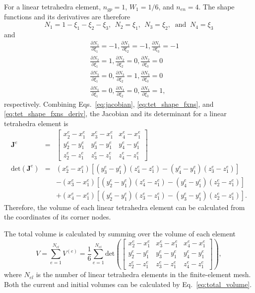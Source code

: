 \documentclass[12pt,aps,pre]{revtex4}
\begin{document}
For a linear tetrahedra element, $n_{gp}=1$, $W_1=1/6$, and $n_{en}=4$. The shape functions and its derivatives are therefore
%
\begin{equation}
N_1 = 1- \xi_1 - \xi_2 - \xi_3, \ \ 
N_2 = \xi_1, \ \
N_3 = \xi_2, \ \text{ and } \
N_4 = \xi_3
\label{eq:tet_shape_fxns}
\end{equation}
%
and
%
\begin{eqnarray}
&&\frac{\partial N_1}{\partial \xi_1} = -1, \frac{\partial N_1}{\partial \xi_2} = -1, \frac{\partial N_1}{\partial \xi_3} = -1 \nonumber\\
%
&&\frac{\partial N_2}{\partial \xi_1} = 1, \frac{\partial N_2}{\partial \xi_2} = 0, \frac{\partial N_2}{\partial \xi_3} = 0 \nonumber\\
%
&&\frac{\partial N_3}{\partial \xi_1} = 0, \frac{\partial N_3}{\partial \xi_2} = 1, \frac{\partial N_3}{\partial \xi_3} = 0 \nonumber\\
%
&&\frac{\partial N_4}{\partial \xi_1} = 0, \frac{\partial N_4}{\partial \xi_2} = 0, \frac{\partial N_4}{\partial \xi_3} = 1,
\label{eq:tet_shape_fxns_deriv}
\end{eqnarray}
%
respectively. Combining Eqs.\ \eqref{eq:jacobian}, \eqref{eq:tet_shape_fxns}, and \eqref{eq:tet_shape_fxns_deriv}, the Jacobian and its determinant for a linear tetrahedra element is 
%
\begin{eqnarray}
\pmb{J}^e &=& \begin{bmatrix}
x_2^e - x_1^e & x_3^e - x_1^e & x_4^e - x_1^e \\
%
y_2^e - y_1^e & y_3^e - y_1^e & y_4^e - y_1^e \\
%
z_2^e - z_1^e & z_3^e - z_1^e & z_4^e - z_1^e 
\end{bmatrix} \nonumber\\
%
\text{det}(\pmb{J}^e) &=& (x_2^e - x_1^e)[(y_3^e - y_1^e)(z_4^e - z_1^e)-(y_4^e - y_1^e)(z_3^e - z_1^e)] \nonumber\\
%
&&-(x_3^e - x_1^e)[(y_2^e - y_1^e)(z_4^e - z_1^e)-(y_4^e - y_1^e)(z_2^e - z_1^e)] \nonumber\\
%
&&+(x_4^e - x_1^e)[(y_2^e - y_1^e)(z_3^e - z_1^e)-(y_3^e - y_1^e)(z_2^e - z_1^e)].
\end{eqnarray}
%
Therefore, the volume of each linear tetrahedra element can be calculated from the coordinates of its corner nodes.

The total volume is calculated by summing over the volume of each element
%
\begin{equation}
V = \sum_{e=1}^{N_{el}} V^{(e)} = \frac{1}{6}\sum_{e=1}^{N_{el}}\text{det}\left( \begin{bmatrix}
x_2^e - x_1^e & x_3^e - x_1^e & x_4^e - x_1^e \\
%
y_2^e - y_1^e & y_3^e - y_1^e & y_4^e - y_1^e \\
%
z_2^e - z_1^e & z_3^e - z_1^e & z_4^e - z_1^e 
\end{bmatrix}\right),
\label{eq:total_volume}
\end{equation}
%
where $N_{el}$ is the number of linear tetrahedra elements in the finite-element mesh. Both the current and initial volumes can be calculated by Eq.\ \eqref{eq:total_volume}.
\end{document}
